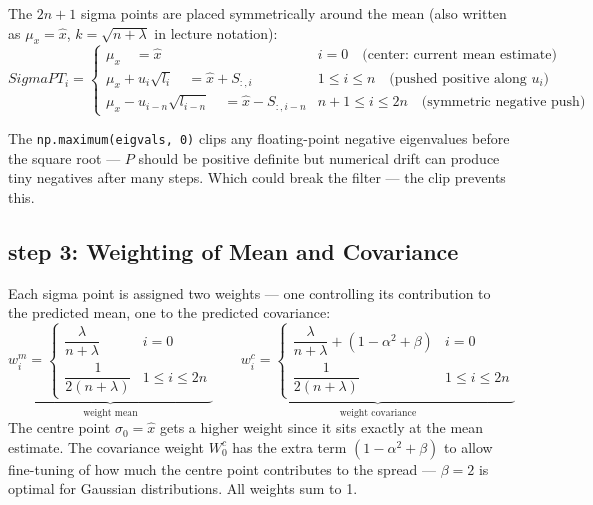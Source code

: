 \documentclass[12pt, a4paper]{article}
\begin{document}
The $2n+1$ sigma points are placed symmetrically around the mean
(also written as $\mu_x = \hat{x}$, $k = \sqrt{n+\lambda}$ in lecture notation):
\[
  SigmaPT_i = \begin{cases}
    \mu_x            \quad =\hat{x} & i = 0 \quad \text{(center: current mean estimate)}\\
    \mu_x + u_i\sqrt{l_i}  \quad= \hat{x} + S_{:,i}   & 1 \leq i \leq n \quad \text{(pushed positive along } u_i\text{)}\\
    \mu_x- u_{i-n}\sqrt{l_{i-n}} \quad= \hat{x} - S_{:,i-n} & n+1 \leq i \leq 2n \quad \text{(symmetric negative push)}
  \end{cases}
\]
\begin{notebox}
The \texttt{np.maximum(eigvals, 0)} clips any floating-point negative eigenvalues
before the square root --- $P$ should be positive definite but numerical drift
can produce tiny negatives after many steps. Which could break the filter --- the clip prevents this.
\end{notebox}
\clearpage
\subsection*{step 3: Weighting of Mean and Covariance}
Each sigma point is assigned two weights --- one controlling its contribution
to the predicted mean, one to the predicted covariance:
\[
  \underbrace{w_i^m= \begin{cases}
    \dfrac{\lambda}{n+\lambda} & i = 0 \\[6pt]
    \dfrac{1}{2(n+\lambda)}    & 1 \leq i \leq 2n
  \end{cases}}_{\text{weight mean}}
  \qquad
  \underbrace{w_i^c = \begin{cases}
    \dfrac{\lambda}{n+\lambda} + (1 - \alpha^2 + \beta) & i = 0 \\[6pt]
    \dfrac{1}{2(n+\lambda)}    & 1 \leq i \leq 2n
  \end{cases}}_{\text{weight covariance}}
\]
The centre point $\sigma_0 = \hat{x}$ gets a higher weight since it sits
exactly at the mean estimate. The covariance weight $W_0^c$ has the extra
term $(1 - \alpha^2 + \beta)$ to allow fine-tuning of how much the centre
point contributes to the spread --- $\beta = 2$ is optimal for Gaussian
distributions. All weights sum to 1.
\end{document}
